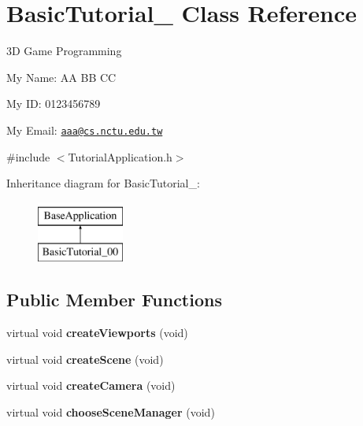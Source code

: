 \hypertarget{class_basic_tutorial__00}{
\section{BasicTutorial\_ Class Reference}
\label{class_basic_tutorial__00}
}


3D Game Programming \par
 My Name: AA BB CC \par
 My ID: 0123456789 \par
 My Email: \href{mailto:aaa@cs.nctu.edu.tw}{\tt aaa@cs.nctu.edu.tw}  




{\ttfamily \#include $<$TutorialApplication.h$>$}

Inheritance diagram for BasicTutorial\_:\begin{figure}[H]
\begin{center}
\leavevmode
\includegraphics[height=2.000000cm]{class_basic_tutorial__00}
\end{center}
\end{figure}
\subsection*{Public Member Functions}
\begin{DoxyCompactItemize}
\item 
\hypertarget{class_basic_tutorial__00_adc2454d9f8226e0958ecf702f355846e}{
virtual void {\bfseries createViewports} (void)}
\label{class_basic_tutorial__00_adc2454d9f8226e0958ecf702f355846e}

\item 
\hypertarget{class_basic_tutorial__00_a15a3d4673724ec99077ce992f996a550}{
virtual void {\bfseries createScene} (void)}
\label{class_basic_tutorial__00_a15a3d4673724ec99077ce992f996a550}

\item 
\hypertarget{class_basic_tutorial__00_a1bf709417d654dffc2ea10987412b912}{
virtual void {\bfseries createCamera} (void)}
\label{class_basic_tutorial__00_a1bf709417d654dffc2ea10987412b912}

\item 
\hypertarget{class_basic_tutorial__00_aba97a29d983586d2dc8e108d3bccf721}{
virtual void {\bfseries chooseSceneManager} (void)}
\label{class_basic_tutorial__00_aba97a29d983586d2dc8e108d3bccf721}

\end{DoxyCompactItemize}


